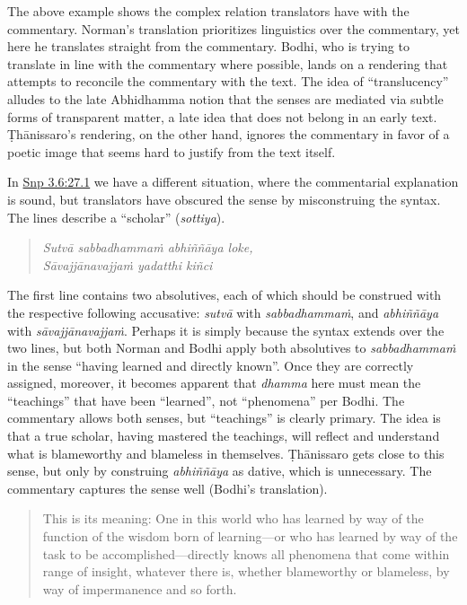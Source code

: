 \documentclass[12pt,openany]{book}%
\begin{document}
The above example shows the complex relation translators have with the commentary. Norman’s translation prioritizes linguistics over the commentary, yet here he translates straight from the commentary. Bodhi, who is trying to translate in line with the commentary where possible, lands on a rendering that attempts to reconcile the commentary with the text. The idea of “translucency” alludes to the late Abhidhamma notion that the senses are mediated via subtle forms of transparent matter, a late idea that does not belong in an early text. \textsanskrit{Ṭhānissaro}’s rendering, on the other hand, ignores the commentary in favor of a poetic image that seems hard to justify from the text itself.

In \href{https://suttacentral.net/snp3.6/en/sujato\#27.1}{Snp 3.6:27.1} we have a different situation, where the commentarial explanation is sound, but translators have obscured the sense by misconstruing the syntax. The lines describe a “scholar” (\textit{sottiya}). 

\begin{verse}%
\textit{\textsanskrit{Sutvā} \textsanskrit{sabbadhammaṁ} \textsanskrit{abhiññāya} loke,} \\
\textit{\textsanskrit{Sāvajjānavajjaṁ} yadatthi \textsanskrit{kiñci}}

%
\end{verse}

The first line contains two absolutives, each of which should be construed with the respective following accusative: \textit{\textsanskrit{sutvā}} with \textit{\textsanskrit{sabbadhammaṁ}}, and \textit{\textsanskrit{abhiññāya}} with \textit{\textsanskrit{sāvajjānavajjaṁ}}. Perhaps it is simply because the syntax extends over the two lines, but both Norman and Bodhi apply both absolutives to \textit{\textsanskrit{sabbadhammaṁ}} in the sense “having learned and directly known”. Once they are correctly assigned, moreover, it becomes apparent that \textit{dhamma} here must mean the “teachings” that have been “learned”, not “phenomena” per Bodhi. The commentary allows both senses, but “teachings” is clearly primary. The idea is that a true scholar, having mastered the teachings, will reflect and understand what is blameworthy and blameless in themselves. \textsanskrit{Ṭhānissaro} gets close to this sense, but only by construing \textit{\textsanskrit{abhiññāya}} as dative, which is unnecessary. The commentary captures the sense well (Bodhi’s translation).

\begin{quotation}%
This is its meaning: One in this world who has learned by way of the function of the wisdom born of learning—or who has learned by way of the task to be accomplished—directly knows all phenomena that come within range of insight, whatever there is, whether blameworthy or blameless, by way of impermanence and so forth.

%
\end{quotation}
\end{document}
